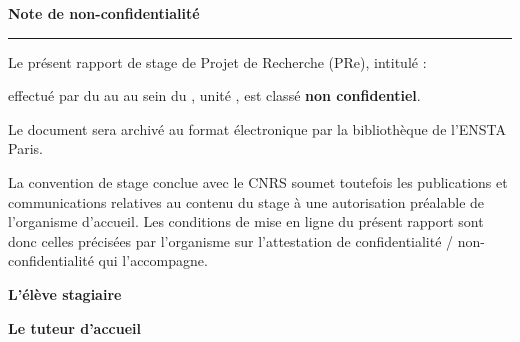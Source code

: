 \clearpage
\thispagestyle{empty}

\begin{center}
  \vspace*{20mm}
  {\Huge\bfseries Note de non-confidentialité\par}
  \vspace{15mm}
  {\color{enstablue}\rule{0.8\textwidth}{1.5pt}\par}
\end{center}

\vspace{15mm}

\noindent Le présent rapport de stage de Projet de Recherche (PRe), intitulé :

\begin{center}
  \vspace{6mm}
  {\Large\bfseries\color{enstablue} \ReportTitle\par}
  \vspace{4mm}
  {\large\itshape \ReportSubtitle\par}
  \vspace{6mm}
\end{center}

\noindent effectué par \StudentName{} du \StageStart{} au \StageEnd{} au sein du \HostName, unité \HostTeam, est classé \textbf{non confidentiel}.

\vspace{10mm}

\noindent Le document sera archivé au format électronique par la bibliothèque de l'ENSTA Paris.

\vspace{10mm}

\noindent La convention de stage conclue avec le CNRS soumet toutefois les publications et communications relatives au contenu du stage à une autorisation préalable de l'organisme d'accueil. Les conditions de mise en ligne du présent rapport sont donc celles précisées par l'organisme sur l'attestation de confidentialité / non-confidentialité qui l'accompagne.

\vspace{25mm}

\noindent\begin{minipage}[t]{0.45\textwidth}
  \textbf{L'élève stagiaire}\\[10mm]
  \StudentName
\end{minipage}
\hfill
\begin{minipage}[t]{0.45\textwidth}
  \textbf{Le tuteur d'accueil}\\[10mm]
  \SupervisorOne{} \\ \SupervisorOneRole
\end{minipage}

\clearpage

